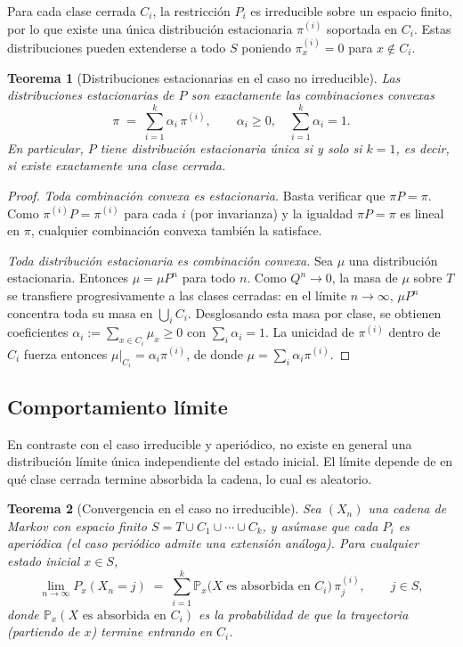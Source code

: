 \documentclass[12pt]{book}
\newtheorem{theorem}{Teorema}[chapter]
\begin{document}
Para cada clase cerrada $C_i$, la restricción $P_i$ es irreducible sobre un espacio finito, por lo que existe una única distribución estacionaria $\pi^{(i)}$ soportada en $C_i$. Estas distribuciones pueden extenderse a todo $S$ poniendo $\pi^{(i)}_x = 0$ para $x \notin C_i$.

\begin{theorem}[Distribuciones estacionarias en el caso no irreducible]
    Las distribuciones estacionarias de $P$ son exactamente las combinaciones convexas
    \[
        \pi \;=\; \sum_{i=1}^k \alpha_i\,\pi^{(i)},
        \qquad \alpha_i \geq 0,\quad \sum_{i=1}^k \alpha_i = 1.
    \]
    En particular, $P$ tiene distribución estacionaria única si y solo si $k=1$, es decir, si existe exactamente una clase cerrada.
\end{theorem}

\begin{proof}
    \textit{Toda combinación convexa es estacionaria.} Basta verificar que $\pi P = \pi$. Como $\pi^{(i)} P = \pi^{(i)}$ para cada $i$ (por invarianza) y la igualdad $\pi P = \pi$ es lineal en $\pi$, cualquier combinación convexa también la satisface.

    \smallskip
    \textit{Toda distribución estacionaria es combinación convexa.} Sea $\mu$ una distribución estacionaria. Entonces $\mu = \mu P^n$ para todo $n$. Como $Q^n \to 0$, la masa de $\mu$ sobre $T$ se transfiere progresivamente a las clases cerradas: en el límite $n\to\infty$, $\mu P^n$ concentra toda su masa en $\bigcup_i C_i$. Desglosando esta masa por clase, se obtienen coeficientes $\alpha_i := \sum_{x \in C_i} \mu_x \geq 0$ con $\sum_i \alpha_i = 1$. La unicidad de $\pi^{(i)}$ dentro de $C_i$ fuerza entonces $\mu|_{C_i} = \alpha_i \pi^{(i)}$, de donde $\mu = \sum_i \alpha_i \pi^{(i)}$.
\end{proof}

\subsection{Comportamiento límite}

En contraste con el caso irreducible y aperiódico, no existe en general una distribución límite única independiente del estado inicial. El límite depende de en qué clase cerrada termine absorbida la cadena, lo cual es aleatorio.

\begin{theorem}[Convergencia en el caso no irreducible]
    Sea $(X_n)$ una cadena de Markov con espacio finito $S = T \cup C_1 \cup \cdots \cup C_k$, y asúmase que cada $P_i$ es aperiódica (el caso periódico admite una extensión análoga). Para cualquier estado inicial $x \in S$,
    \[
        \lim_{n\to\infty} P_x(X_n = j)
        \;=\;
        \sum_{i=1}^k \mathbb{P}_x\!\bigl(X \text{ es absorbida en } C_i\bigr)\,\pi^{(i)}_j, \qquad j \in S,
    \]
    donde $\mathbb{P}_x(X \text{ es absorbida en } C_i)$ es la probabilidad de que la trayectoria (partiendo de $x$) termine entrando en $C_i$.
\end{theorem}
\end{document}
